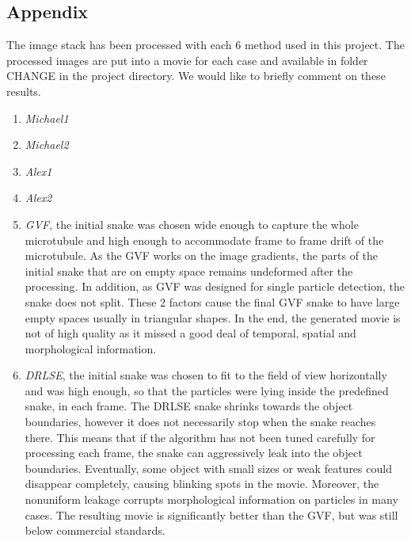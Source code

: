 \documentclass{article}
\begin{document}
\clearpage
\subsection*{Appendix}

The image stack has been processed with each 6 method used in this project. The processed images are put into a movie for each case and available in folder CHANGE in the project directory. We would like to briefly comment on these results.

\begin{enumerate}
\item \em Michael1
\item \em Michael2
\item \em Alex1
\item \em Alex2

\item \emph{GVF}, the initial snake was chosen wide enough to capture the whole microtubule and high enough to accommodate frame to frame drift of the microtubule. As the GVF works on the image gradients, the parts of the initial snake that are on empty space remains undeformed after the processing. In addition, as GVF was designed for single particle detection, the snake does not split. These 2 factors cause the final GVF snake to have large empty spaces usually in triangular shapes. In the end, the generated movie is not of high quality as it missed a good deal of temporal, spatial and morphological information.

\item \emph{DRLSE}, the initial snake was chosen to fit to the field of view horizontally and was high enough, so that the particles were lying inside the predefined snake, in each frame. The DRLSE snake shrinks towards the object boundaries, however it does not necessarily stop when the snake reaches there. This means that if the algorithm has not been tuned carefully for processing each frame, the snake can aggressively leak into the object boundaries. Eventually, some object with small sizes or weak features could disappear completely, causing blinking spots in the movie. Moreover, the nonuniform leakage corrupts morphological information on particles in many cases. The resulting movie is significantly better than the GVF, but was still below commercial standards.


\end {enumerate}
\end{document}
